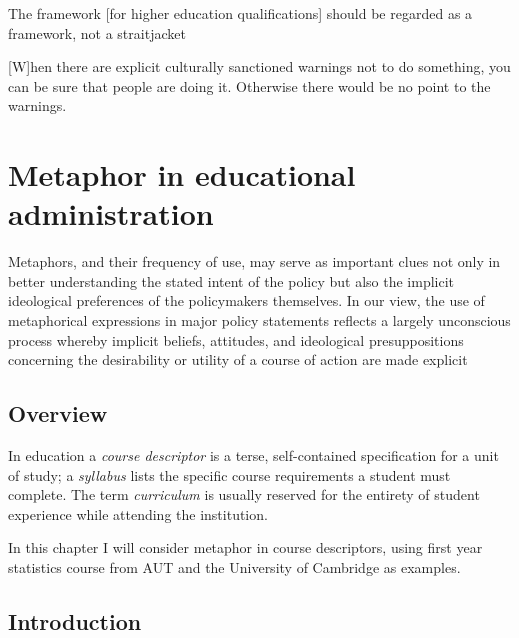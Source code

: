 \begin{singlespace}
\begin{savequote}[105mm]
The framework [for higher education qualifications] should be regarded
as a framework, not a straitjacket

[W]hen there are explicit culturally sanctioned warnings not to do
something, you can be sure that people are doing it.  Otherwise there
would be no point to the warnings.
\end{savequote}
\end{singlespace}

\chapter{Metaphor in educational administration}
\label{chapter3}

\begin{singlespace}
\setlength{\epigraphwidth}{.7\textwidth} %
\epigraph{Metaphors, and their frequency of use, may serve as
  important clues not only in better understanding the stated intent
  of the policy but also the implicit ideological preferences of the
  policymakers themselves.  In our view, the use of metaphorical
  expressions in major policy statements reflects a largely
  unconscious process whereby implicit beliefs, attitudes, and
  ideological presuppositions concerning the desirability or utility
  of a course of action are made explicit}{}
\end{singlespace}

\section{Overview}

In education a \emph{course descriptor} is a terse, self-contained
specification for a unit of study; a \emph{syllabus} lists the
specific course requirements a student must complete.  The term
\emph{curriculum} is usually reserved for the entirety of student
experience while attending the institution.

In this chapter I will consider metaphor in course descriptors, using
first year statistics course from AUT and the University of Cambridge
as examples.

\section{Introduction}

